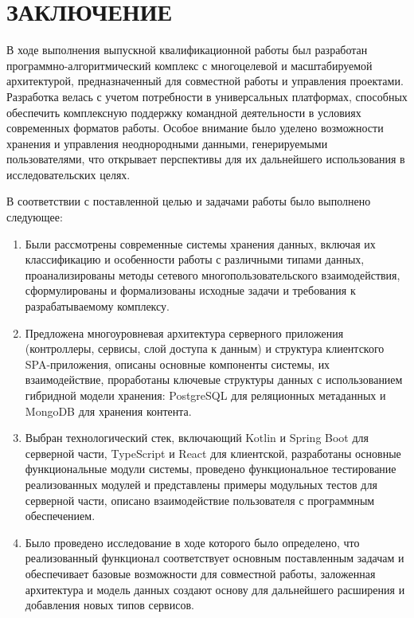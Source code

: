 \chapter*{ЗАКЛЮЧЕНИЕ}

В ходе выполнения выпускной квалификационной работы был разработан программно-алгоритмический комплекс с многоцелевой и масштабируемой архитектурой, предназначенный для совместной работы и управления проектами. 
Разработка велась с учетом потребности в универсальных платформах, способных обеспечить комплексную поддержку командной деятельности в условиях современных форматов работы. 
Особое внимание было уделено возможности хранения и управления неоднородными данными, генерируемыми пользователями, что открывает перспективы для их дальнейшего использования в исследовательских целях.

В соответствии с поставленной целью и задачами работы было выполнено следующее:
\begin{enumerate}
    \item Были рассмотрены современные системы хранения данных, включая их классификацию и особенности работы с различными типами данных, проанализированы методы сетевого многопользовательского взаимодействия, сформулированы и формализованы исходные задачи и требования к разрабатываемому комплексу.
    \item Предложена многоуровневая архитектура серверного приложения (контроллеры, сервисы, слой доступа к данным) и структура клиентского SPA-приложения, описаны основные компоненты системы, их взаимодействие, проработаны ключевые структуры данных с использованием гибридной модели хранения: PostgreSQL для реляционных метаданных и MongoDB для хранения контента.
    \item Выбран технологический стек, включающий Kotlin и Spring Boot для серверной части, TypeScript и React для клиентской, разработаны основные функциональные модули системы, проведено функциональное тестирование реализованных модулей и представлены примеры модульных тестов для серверной части, описано взаимодействие пользователя с программным обеспечением.
    \item Было проведено исследование в ходе которого было определено, что реализованный функционал соответствует основным поставленным задачам и обеспечивает базовые возможности для совместной работы, заложенная архитектура и модель данных создают основу для дальнейшего расширения и добавления новых типов сервисов.
\end{enumerate}

